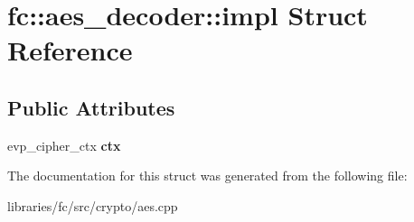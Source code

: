 \hypertarget{structfc_1_1aes__decoder_1_1impl}{}\section{fc\+:\+:aes\+\_\+decoder\+:\+:impl Struct Reference}
\label{structfc_1_1aes__decoder_1_1impl}
\subsection*{Public Attributes}
\begin{DoxyCompactItemize}
\item 
\mbox{\label{structfc_1_1aes__decoder_1_1impl_a286d2af08a0edbcd1c97b8ad357c1421}} 
evp\+\_\+cipher\+\_\+ctx {\bfseries ctx}
\end{DoxyCompactItemize}


The documentation for this struct was generated from the following file\+:\begin{DoxyCompactItemize}
\item 
libraries/fc/src/crypto/aes.\+cpp\end{DoxyCompactItemize}
